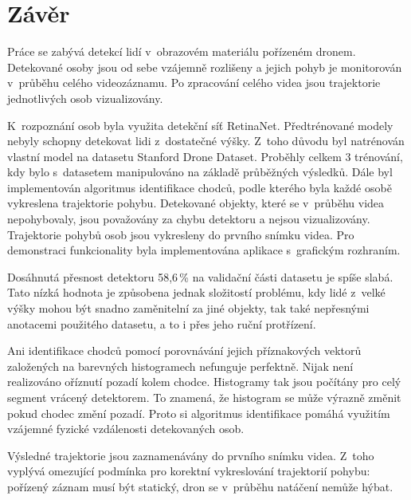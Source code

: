 
\chapter{Závěr}
\label{chap_7}

Práce se zabývá detekcí lidí v~obrazovém materiálu pořízeném dronem. Detekované osoby jsou od sebe vzájemně rozlišeny a jejich pohyb je monitorován v~průběhu celého videozáznamu. Po zpracování celého videa jsou trajektorie jednotlivých osob vizualizovány.

K~rozpoznání osob byla využita detekční síť RetinaNet. Předtrénované modely nebyly schopny detekovat lidi z~dostatečné výšky. Z~toho důvodu byl natrénován vlastní model na datasetu Stanford Drone Dataset. Proběhly celkem 3 trénování, kdy bylo s~datasetem manipulováno na základě průběžných výsledků. Dále byl implementován algoritmus identifikace chodců, podle kterého byla každé osobě vykreslena trajektorie pohybu. Detekované objekty, které se v~průběhu videa nepohybovaly, jsou považovány za chybu detektoru a nejsou vizualizovány. Trajektorie pohybů osob jsou vykresleny do prvního snímku videa. Pro demonstraci funkcionality byla implementována aplikace s~grafickým rozhraním.

Dosáhnutá přesnost detektoru 58,6\,\% na validační části datasetu je spíše slabá. Tato nízká hodnota je způsobena jednak složitostí problému, kdy lidé z~velké výšky mohou být snadno zaměnitelní za jiné objekty, tak také nepřesnými anotacemi použitého datasetu, a to i přes jeho ruční protřízení.

Ani identifikace chodců pomocí porovnávání jejich příznakových vektorů založených na barevných histogramech nefunguje perfektně. Nijak není realizováno oříznutí pozadí kolem chodce. Histogramy tak jsou počítány pro celý segment vrácený detektorem. To znamená, že histogram se může výrazně změnit pokud chodec změní pozadí. Proto si algoritmus identifikace pomáhá využitím vzájemné fyzické vzdálenosti detekovaných osob.

Výsledné trajektorie jsou zaznamenávány do prvního snímku  videa. Z~toho vyplývá omezující podmínka pro korektní vykreslování trajektorií pohybu: pořízený záznam musí být statický, dron se v~průběhu natáčení nemůže hýbat.


